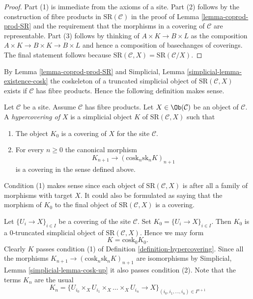 \begin{proof}
Part (1) is immediate from the axioms of a site.
Part (2) follows by the construction of fibre products
in $\text{SR}(\mathcal{C})$ in the proof of
Lemma \ref{lemma-coprod-prod-SR}
and the requirement that the morphisms in a covering
of $\mathcal{C}$ are representable.
Part (3) follows by thinking of $A \times K \to B \times L$
as the composition $A \times K \to B \times K \to B \times L$
and hence a composition of basechanges of coverings.
The final statement follows because $\text{SR}(\mathcal{C}, X) =
\text{SR}(\mathcal{C}/X)$.
\end{proof}

\noindent
By Lemma \ref{lemma-coprod-prod-SR} and
Simplicial, Lemma \ref{simplicial-lemma-existence-cosk}
the coskeleton of a truncated simplicial object of
$\text{SR}(\mathcal{C}, X)$ exists if $\mathcal{C}$ has fibre products.
Hence the following definition makes sense.

\begin{definition}
\label{definition-hypercovering}
Let $\mathcal{C}$ be a site. Assume $\mathcal{C}$ has fibre products.
Let $X \in \Ob(\mathcal{C})$ be an object of $\mathcal{C}$.
A {\it hypercovering of $X$} is a simplicial object
$K$ of $\text{SR}(\mathcal{C}, X)$ such that
\begin{enumerate}
\item The object $K_0$ is a covering of $X$ for the site $\mathcal{C}$.
\item For every $n \geq 0$ the canonical morphism
$$
K_{n + 1} \longrightarrow (\text{cosk}_n \text{sk}_n K)_{n + 1}
$$
is a covering in the sense defined above.
\end{enumerate}
\end{definition}

\noindent
Condition (1) makes sense since each object of
$\text{SR}(\mathcal{C}, X)$ is after all a family
of morphisms with target $X$. It could also be
formulated as saying that the morphism of $K_0$ to
the final object of $\text{SR}(\mathcal{C}, X)$
is a covering.

\begin{example}
\label{example-cech}
Let $\{U_i \to X\}_{i \in I}$ be a covering of the site $\mathcal{C}$.
Set $K_0 = \{U_i \to X\}_{i \in I}$.
Then $K_0$ is a $0$-truncated simplicial object of
$\text{SR}(\mathcal{C}, X)$. Hence we may form
$$
K = \text{cosk}_0 K_0.
$$
Clearly $K$ passes condition (1) of Definition \ref{definition-hypercovering}.
Since all the morphisms $K_{n + 1} \to (\text{cosk}_n \text{sk}_n K)_{n + 1}$
are isomorphisms by
Simplicial, Lemma \ref{simplicial-lemma-cosk-up}
it also passes condition (2). Note that
the terms $K_n$ are the usual
$$
K_n = \{
U_{i_0} \times_X U_{i_1} \times_X \ldots \times_X U_{i_n} \to X
\}_{(i_0, i_1, \ldots, i_n) \in I^{n + 1}}
$$
\end{example}


